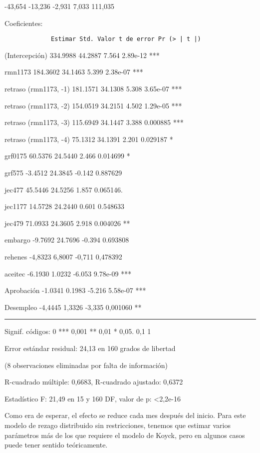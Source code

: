 \documentclass[
]{book}
\begin{document}
-43,654 -13,236 -2,931 7,033 111,035

Coeficientes:

\begin{verbatim}
             Estimar Std. Valor t de error Pr (> | t |)
\end{verbatim}

(Intercepción) 334.9988 44.2887 7.564 2.89e-12 ***

rmn1173 184.3602 34.1463 5.399 2.38e-07 ***

retraso (rmn1173, -1) 181.1571 34.1308 5.308 3.65e-07 ***

retraso (rmn1173, -2) 154.0519 34.2151 4.502 1.29e-05 ***

retraso (rmn1173, -3) 115.6949 34.1447 3.388 0.000885 ***

retraso (rmn1173, -4) 75.1312 34.1391 2.201 0.029187 *

grf0175 60.5376 24.5440 2.466 0.014699 *

grf575 -3.4512 24.3845 -0.142 0.887629

jec477 45.5446 24.5256 1.857 0.065146.

jec1177 14.5728 24.2440 0.601 0.548633

jec479 71.0933 24.3605 2.918 0.004026 **

embargo -9.7692 24.7696 -0.394 0.693808

rehenes -4,8323 6,8007 -0,711 0,478392

aceitec -6.1930 1.0232 -6.053 9.78e-09 ***

Aprobación -1.0341 0.1983 -5.216 5.58e-07 ***

Desempleo -4,4445 1,3326 -3,335 0,001060 **

\begin{center}\rule{0.5\linewidth}{0.5pt}\end{center}

Signif. códigos: 0 *** 0,001 ** 0,01 * 0,05. 0,1 1

Error estándar residual: 24,13 en 160 grados de libertad

(8 observaciones eliminadas por falta de información)

R-cuadrado múltiple: 0,6683, R-cuadrado ajustado: 0,6372

Estadístico F: 21,49 en 15 y 160 DF, valor de p: \textless2,2e-16

Como era de esperar, el efecto se reduce cada mes después del inicio. Para este modelo de rezago distribuido sin restricciones, tenemos que estimar varios parámetros más de los que requiere el modelo de Koyck, pero en algunos casos puede tener sentido teóricamente.
\end{document}
